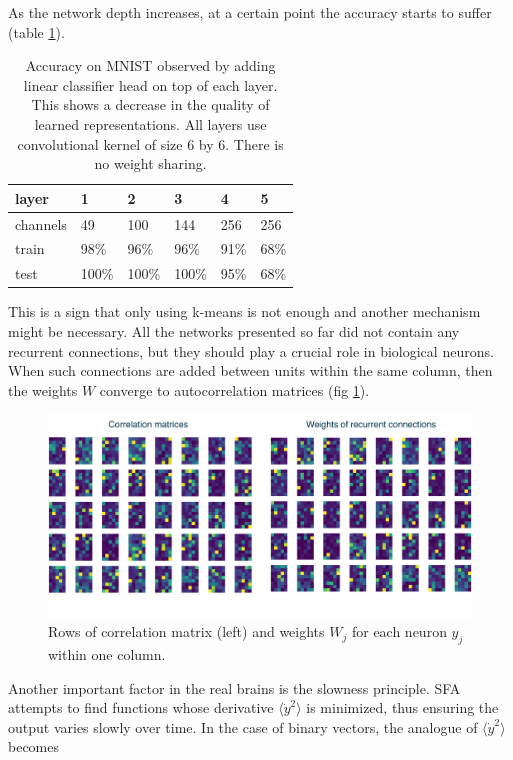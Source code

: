 \documentclass[12pt]{article}
\begin{document}
As the network depth increases, at a certain point the accuracy starts to suffer (table \ref{table:ecc_accuracy}).
\begin{table}[]
	\begin{tabular}{|llllll|}
		\hline
		layer    & 1     & 2     & 3     & 4    & 5    \\ \hline
		channels & 49    & 100   & 144   & 256  & 256  \\ 
		train    & 98\%  & 96\%  & 96\%  & 91\% & 68\% \\ 
		test     & 100\% & 100\% & 100\% & 95\% & 68\% \\ \hline
	\end{tabular}
	\label{table:ecc_accuracy}
	\caption{Accuracy on MNIST observed by adding linear classifier head on top of each layer. This shows a decrease in the quality of learned representations. All layers use convolutional kernel of size 6 by 6. There is no weight sharing.}
\end{table}
This is a sign that only using k-means is not enough and another mechanism might be necessary. All the networks presented so far did not contain any recurrent connections, but they should play a crucial role in biological neurons. When such connections are added between units within the same column, then the weights $W$ converge to autocorrelation matrices (fig \ref{fig:recurrent_connections}).
\begin{figure}[!htbp]
	\centering
	\includegraphics[width=13.5cm]{recurrent_connections}
	\caption{Rows of correlation matrix (left) and weights $W_j$ for each neuron $y_j$ within one column.}
	\label{fig:recurrent_connections}
\end{figure} 
Another important factor in the real brains is the slowness principle. SFA attempts to find functions whose derivative $\langle \dot{y}^2 \rangle$ is minimized, thus ensuring the output varies slowly over time.
In the case of binary vectors, the analogue of $\langle \dot{y}^2 \rangle$   becomes
\end{document}

